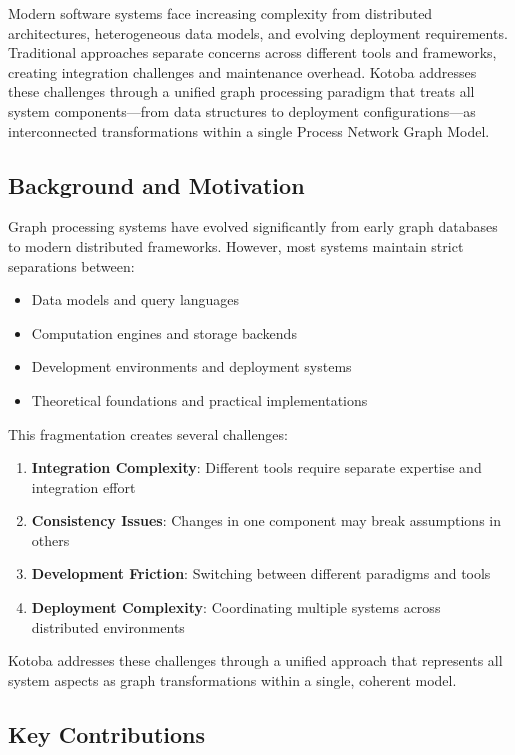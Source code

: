 \documentclass[11pt,a4paper]{article}
\begin{document}
Modern software systems face increasing complexity from distributed architectures, heterogeneous data models, and evolving deployment requirements. Traditional approaches separate concerns across different tools and frameworks, creating integration challenges and maintenance overhead. Kotoba addresses these challenges through a unified graph processing paradigm that treats all system components---from data structures to deployment configurations---as interconnected transformations within a single Process Network Graph Model.

\subsection{Background and Motivation}
\label{subsec:background}

Graph processing systems have evolved significantly from early graph databases to modern distributed frameworks. However, most systems maintain strict separations between:
\begin{itemize}
\item Data models and query languages
\item Computation engines and storage backends
\item Development environments and deployment systems
\item Theoretical foundations and practical implementations
\end{itemize}

This fragmentation creates several challenges:
\begin{enumerate}
\item \textbf{Integration Complexity}: Different tools require separate expertise and integration effort
\item \textbf{Consistency Issues}: Changes in one component may break assumptions in others
\item \textbf{Development Friction}: Switching between different paradigms and tools
\item \textbf{Deployment Complexity}: Coordinating multiple systems across distributed environments
\end{enumerate}

Kotoba addresses these challenges through a unified approach that represents all system aspects as graph transformations within a single, coherent model.

\subsection{Key Contributions}
\label{subsec:contributions}
\end{document}
